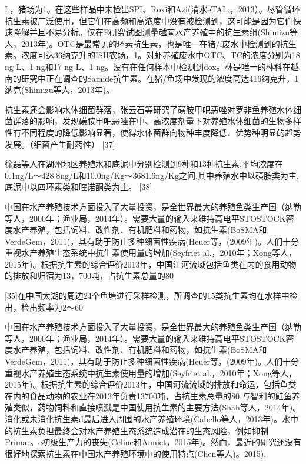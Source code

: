 \documentclass{SCIS2020cn}
\begin{document}
L，猪场为1。在这些样品中未检出SPI、Roxi和Azi(清水eTAL.，2013）。尽管循环抗生素被广泛使用，但它们在高频和高浓度中没有被检测到，这可能是因为它们快速降解并且不易分析。仅在E研究试图测量越南水产养殖中的抗生素组(Shimizu等人，2013年)。OTC是最常见的环素抗生素，也是唯一在猪/f废水中检测到的抗生素。浓度可达36纳克升的ISH农场，1。对虾养殖废水中OTC、TC的浓度分别为18 ng L、1 ng和17 ng L、1 ng。没有在任何样本中检测到dox。林是唯一的林科在越南的研究中正在调查的Samide抗生素。在猪/鱼场中发现的浓度高达416纳克升，1纳克(Shimizu等人，2013年)。

抗生素还会影响水体细菌群落，张云石等研究了磺胺甲吧恶唑对罗非鱼养殖水体细菌群落的影响，发现磺胺甲吧恶唑在中、高浓度剂量下对养殖水体细菌的生物多样性有不同程度的降低影响显著，使得水体菌群向物种丰度降低、优势种明显的趋势发展。（细菌产生耐药性） [37]


徐磊等人在湖州地区养殖水和底泥中分别检测到9种和13种抗生素,平均浓度在0.1ng/L～428.8ng/L和10.0ng/Kg～3681.6ng/Kg之间,其中养殖水中以磺胺类为主,底泥中以四环素类和喹诺酮类为主。 [38]



中国在水产养殖技术方面投入了大量投资，是全世界最大的养殖鱼类生产国（纳勒等人，2000年；渔业局，2014年）。需要大量的输入来维持高电平STOSTOCK密度水产养殖，包括饲料、改性剂、有机肥料和药物，如抗生素(BoSMA和VerdeGem，2011)，其有助于防止多种细菌性疾病(Heuer等，(2009年)。人们十分重视水产养殖生态系统中抗生素使用量的增加(Seyfriet al.，2010年；Xong等人，2015年)。根据抗生素的综合评价2013年，中国江河流域包括鱼类在内的食用动物的排放和归宿为13，700吨，占抗生素总量的80%


[35]在中国太湖的周边24个鱼塘进行采样检测，所调查的15类抗生素均在水样中检出，检出频率为2～60%


中国在水产养殖技术方面投入了大量投资，是全世界最大的养殖鱼类生产国（纳勒等人，2000年；渔业局，2014年）。需要大量的输入来维持高电平STOSTOCK密度水产养殖，包括饲料、改性剂、有机肥料和药物，如抗生素(BoSMA和VerdeGem，2011)，其有助于防止多种细菌性疾病(Heuer等，(2009年)。人们十分重视水产养殖生态系统中抗生素使用量的增加(Seyfriet al.，2010年；Xong等人，2015年)。根据抗生素的综合评价2013年，中国河流流域的排放和命运，包括鱼类在内的食品动物的农业在2013年负责13700吨，占抗生素总量的80%
与智利的鲑鱼养殖类似，药物饲料和直接喷溅是中国使用抗生素的主要方法(Shah等人，2014年)。消化或未消化抗生素d最后进入周围的水产养殖环境(Cabello等人，2013年)。水中的抗生素负担最终会对水产养殖生态系统造成潜在的生态风险，例如抑制Primar。e初级生产力的丧失(Celine和Anniet，2015年)。然而，最近的研究还没有很好地探索抗生素在中国水产养殖环境中的使用特点(Chen等人)。2015).
\end{document}
